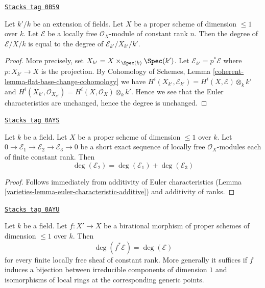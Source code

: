 \begin{lemma}
\label{varieties-lemma-degree-base-change}
\href{https://stacks.math.columbia.edu/tag/0B59}{\texttt{Stacks tag 0B59}}

Let $k'/k$ be an extension of fields. Let $X$ be a proper scheme of
dimension $\leq 1$ over $k$. Let $\mathcal{E}$ be a locally free
$\mathcal{O}_X$-module of constant rank $n$. Then the degree of
$\mathcal{E}/X/k$ is equal to the degree of
$\mathcal{E}_{k'}/X_{k'}/k'$.
\end{lemma}

\begin{proof}
More precisely, set $X_{k'} = X \times_{\Spec(k)} \Spec(k')$.
Let $\mathcal{E}_{k'} = p^*\mathcal{E}$ where $p : X_{k'} \to X$
is the projection. By
Cohomology of Schemes, Lemma \ref{coherent-lemma-flat-base-change-cohomology}
we have
$H^i(X_{k'}, \mathcal{E}_{k'}) = H^i(X, \mathcal{E}) \otimes_k k'$
and
$H^i(X_{k'}, \mathcal{O}_{X_{k'}}) = H^i(X, \mathcal{O}_X) \otimes_k k'$.
Hence we see that the Euler characteristics are unchanged, hence the
degree is unchanged.
\end{proof}

\begin{lemma}
\label{varieties-lemma-degree-additive}
\href{https://stacks.math.columbia.edu/tag/0AYS}{\texttt{Stacks tag 0AYS}}

Let $k$ be a field. Let $X$ be a proper scheme of dimension $\leq 1$
over $k$. Let $0 \to \mathcal{E}_1 \to \mathcal{E}_2 \to \mathcal{E}_3 \to 0$
be a short exact sequence of locally free $\mathcal{O}_X$-modules
each of finite constant rank. Then
$$
\deg(\mathcal{E}_2) = \deg(\mathcal{E}_1) + \deg(\mathcal{E}_3)
$$
\end{lemma}

\begin{proof}

Follows immediately from additivity of Euler characteristics
(Lemma \ref{varieties-lemma-euler-characteristic-additive})
and additivity of ranks.
\end{proof}

\begin{lemma}
\label{varieties-lemma-degree-birational-pullback}
\href{https://stacks.math.columbia.edu/tag/0AYU}{\texttt{Stacks tag 0AYU}}

Let $k$ be a field. Let $f : X' \to X$ be a birational morphism of
proper schemes of dimension $\leq 1$ over $k$. Then
$$
\deg(f^*\mathcal{E}) = \deg(\mathcal{E})
$$
for every finite locally free sheaf of constant rank. More generally
it suffices if $f$ induces a bijection between irreducible components
of dimension $1$ and isomorphisms of local rings at the corresponding
generic points.
\end{lemma}

